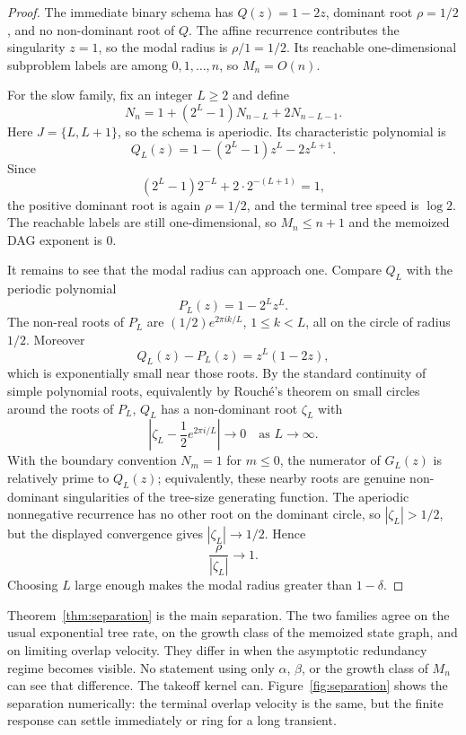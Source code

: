 \documentclass[10pt,twocolumn]{article}
\begin{document}
\begin{proof}
The immediate binary schema has \(Q(z)=1-2z\), dominant root \(\rho=1/2\), and no non-dominant root of \(Q\).  The affine recurrence contributes the singularity \(z=1\), so the modal radius is \(\rho/1=1/2\).  Its reachable one-dimensional subproblem labels are among \(0,1,\ldots,n\), so \(M_n=O(n)\).

For the slow family, fix an integer \(L\ge2\) and define
\[
        N_n=1+(2^{L}-1)N_{n-L}+2N_{n-L-1}.
\]
Here \(J=\{L,L+1\}\), so the schema is aperiodic.  Its characteristic polynomial is
\[
        Q_L(z)=1-(2^{L}-1)z^L-2z^{L+1}.
\]
Since
\[
        (2^{L}-1)2^{-L}+2\cdot2^{-(L+1)}=1,
\]
the positive dominant root is again \(\rho=1/2\), and the terminal tree speed is \(\log2\).  The reachable labels are still one-dimensional, so \(M_n\le n+1\) and the memoized DAG exponent is \(0\).

It remains to see that the modal radius can approach one.  Compare \(Q_L\) with the periodic polynomial
\[
        P_L(z)=1-2^{L}z^L.
\]
The non-real roots of \(P_L\) are \((1/2)e^{2\pi i k/L}\), \(1\le k<L\), all on the circle of radius \(1/2\).  Moreover
\[
        Q_L(z)-P_L(z)=z^L(1-2z),
\]
which is exponentially small near those roots.  By the standard continuity of simple polynomial roots, equivalently by Rouch\'e's theorem on small circles around the roots of \(P_L\), \(Q_L\) has a non-dominant root \(\zeta_L\) with
\[
        \left|\zeta_L-\frac12e^{2\pi i/L}\right|\to0
        \quad\text{as }L\to\infty.
\]
With the boundary convention \(N_m=1\) for \(m\le0\), the numerator of \(G_L(z)\) is relatively prime to \(Q_L(z)\); equivalently, these nearby roots are genuine non-dominant singularities of the tree-size generating function.  The aperiodic nonnegative recurrence has no other root on the dominant circle, so \(|\zeta_L|>1/2\), but the displayed convergence gives \(|\zeta_L|\to1/2\).  Hence
\[
        \frac{\rho}{|\zeta_L|}\to1.
\]
Choosing \(L\) large enough makes the modal radius greater than \(1-\delta\).
\end{proof}

Theorem~\ref{thm:separation} is the main separation.  The two families agree on the usual exponential tree rate, on the growth class of the memoized state graph, and on limiting overlap velocity.  They differ in when the asymptotic redundancy regime becomes visible.  No statement using only \(\alpha\), \(\beta\), or the growth class of \(M_n\) can see that difference.  The takeoff kernel can.  Figure~\ref{fig:separation} shows the separation numerically: the terminal overlap velocity is the same, but the finite response can settle immediately or ring for a long transient.
\end{document}
